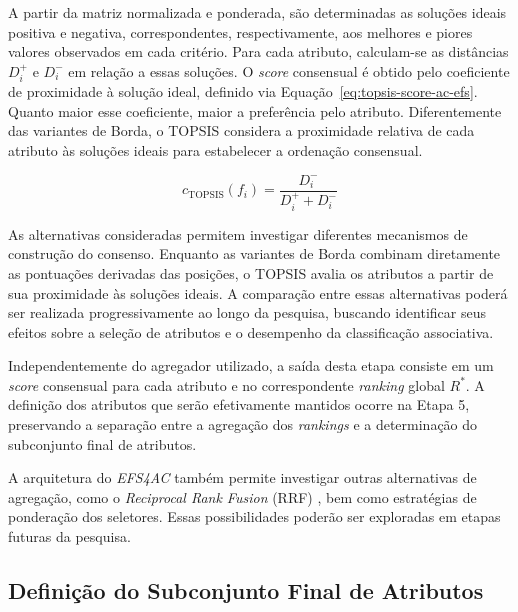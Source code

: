 \begin{enumerate}
    A partir da matriz normalizada e ponderada, são determinadas as soluções ideais positiva e negativa, correspondentes, respectivamente, aos melhores e piores valores observados em cada critério. Para cada atributo, calculam-se as distâncias $D_i^{+}$ e $D_i^{-}$ em relação a essas soluções. O \textit{score} consensual é obtido pelo coeficiente de proximidade à solução ideal, definido via Equação~\ref{eq:topsis-score-ac-efs}. Quanto maior esse coeficiente, maior a preferência pelo atributo. Diferentemente das variantes de Borda, o TOPSIS considera a proximidade relativa de cada atributo às soluções ideais para estabelecer a ordenação consensual.

    \begin{equation}\label{eq:topsis-score-ac-efs}
        c_{\mathrm{TOPSIS}}(f_i)
        =
        \frac{D_i^{-}}{D_i^{+}+D_i^{-}}
    \end{equation}
\end{enumerate}

As alternativas consideradas permitem investigar diferentes mecanismos de construção do consenso. Enquanto as variantes de Borda combinam diretamente as pontuações derivadas das posições, o TOPSIS avalia os atributos a partir de sua proximidade às soluções ideais. A comparação entre essas alternativas poderá ser realizada progressivamente ao longo da pesquisa, buscando identificar seus efeitos sobre a seleção de atributos e o desempenho da classificação associativa.

Independentemente do agregador utilizado, a saída desta etapa consiste em um \textit{score} consensual para cada atributo e no correspondente \textit{ranking} global $R^{*}$. A definição dos atributos que serão efetivamente mantidos ocorre na Etapa 5, preservando a separação entre a agregação dos \textit{rankings} e a determinação do subconjunto final de atributos.

A arquitetura do \textit{EFS4AC} também permite investigar outras alternativas de agregação, como o \textit{Reciprocal Rank Fusion} (RRF) \cite{Cormack2009RRF}, bem como estratégias de ponderação dos seletores. Essas possibilidades poderão ser exploradas em etapas futuras da pesquisa.

\subsection{Definição do Subconjunto Final de Atributos}\label{sec:ac-efs-etapa5}

